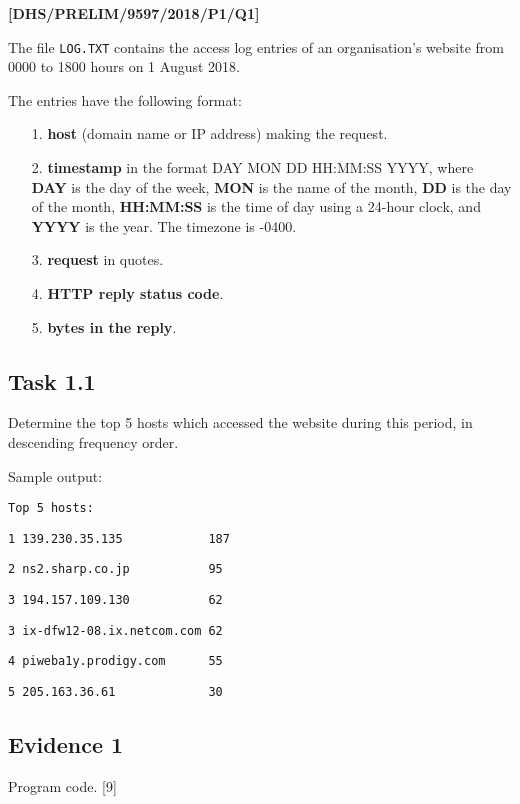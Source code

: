 \item \textbf{{[}DHS/PRELIM/9597/2018/P1/Q1{]} }

The file \texttt{LOG.TXT} contains the access log entries of an organisation's
website from 0000 to 1800 hours on 1 August 2018.

The entries have the following format: 
\begin{enumerate}
\item[1.]  \textbf{host} (domain name or IP address) making the request.
\item[2.]  \textbf{timestamp} in the format \textquotedbl DAY MON DD HH:MM:SS
YYYY\textquotedbl , where \textbf{DAY} is the day of the week, \textbf{MON}
is the name of the month, \textbf{DD} is the day of the month, \textbf{HH:MM:SS}
is the time of day using a 24-hour clock, and \textbf{YYYY} is the
year. The timezone is -0400.
\item[3.]  \textbf{request} in quotes. 
\item[4.]  \textbf{HTTP reply status code}. 
\item[5.]  \textbf{bytes in the reply}.
\end{enumerate}

\subsection*{Task 1.1 }

Determine the top 5 hosts which accessed the website during this period,
in descending frequency order.

Sample output: 

\noindent %
\noindent\begin{minipage}[t]{1\columnwidth}%
\texttt{Top 5 hosts: }

\texttt{1 139.230.35.135 ~~~~~~~~~~~187}

\texttt{2 ns2.sharp.co.jp ~~~~~~~~~~95 }

\texttt{3 194.157.109.130 ~~~~~~~~~~62 }

\texttt{3 ix-dfw12-08.ix.netcom.com 62 }

\texttt{4 piweba1y.prodigy.com ~~~~~55 }

\texttt{5 205.163.36.61 ~~~~~~~~~~~~30}%
\end{minipage}

\subsection*{Evidence 1 }

Program code.\hfill{} {[}9{]}

